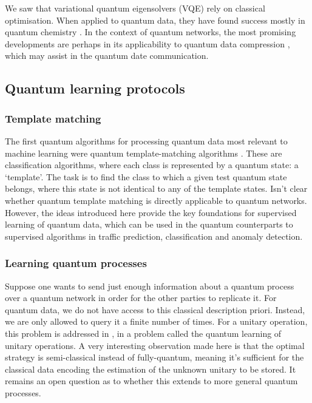 \documentclass[twocolumn, aps, rmp, amsmath, amssymb, nofootinbib, superscriptaddress, longbibliography, floatfix, table-of-contents, eqsecnum]{revtex4}
\begin{document}
We saw that variational quantum eigensolvers (VQE) rely on classical optimisation. When applied to quantum data, they have found success mostly in quantum chemistry \cite{bib:peruzzo2014peruzzo, bib:moll2018quantum}. In the context of quantum networks, the most promising developments are perhaps in its applicability to quantum data compression \cite{bib:jonromero}, which may assist in the quantum date communication. 

\subsection{Quantum learning protocols}

\subsubsection{Template matching}

The first quantum algorithms for processing quantum data most relevant to machine learning were quantum template-matching algorithms \cite{bib:sasaki1, bib:sasaki2}. These are classification algorithms, where each class is represented by a quantum state: a `template'. The task is to find the class to which a given test quantum state belongs, where this state is not identical to any of the template states. Isn't clear whether quantum template matching is directly applicable to quantum networks. However, the ideas introduced here provide the key foundations for supervised learning of quantum data, which can be used in the quantum counterparts to supervised algorithms in traffic prediction, classification and anomaly detection.

\subsubsection{Learning quantum processes}

Suppose one wants to send just enough information about a quantum process over a quantum network in order for the other parties to replicate it. For quantum data, we do not have access to this classical description priori. Instead, we are only allowed to query it a finite number of times. For a unitary operation, this problem is addressed in \cite{bib:bisio_optimal_2010}, in a problem called the quantum learning of unitary operations. A very interesting observation made here is that the optimal strategy is semi-classical instead of fully-quantum, meaning it's sufficient for the classical data encoding the estimation of the unknown unitary to be stored. It remains an open question as to whether this extends to more general quantum processes.
\end{document}
